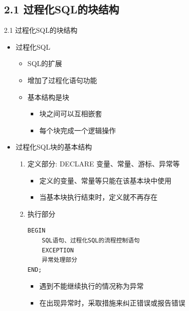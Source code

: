 \subsection{2.1 过程化SQL的块结构}
\begin{frame}{2.1 过程化SQL的块结构}
    \begin{itemize}
        \item 过程化SQL 
        \begin{itemize} 
            \item SQL的扩展
            \item 增加了过程化语句功能
            \item 基本结构是块
            \begin{itemize} 
                \item 块之间可以互相嵌套
                \item 每个块完成一个逻辑操作
            \end{itemize}
        \end{itemize}
        \item 过程化SQL块的基本结构
        \begin{enumerate}
            \item 定义部分: DECLARE 变量、常量、游标、异常等   
            \begin{itemize}
                \item 定义的变量、常量等只能在该基本块中使用
                \item 当基本块执行结束时，定义就不再存在
            \end{itemize}
            \item 执行部分
\begin{block}{}
\begin{lstlisting}
BEGIN
    SQL语句、过程化SQL的流程控制语句
    EXCEPTION
    异常处理部分
END;
\end{lstlisting}
\end{block} 
\begin{itemize}
    \item 遇到不能继续执行的情况称为异常
    \item 在出现异常时，采取措施来纠正错误或报告错误
\end{itemize}
        \end{enumerate}
    \end{itemize}
\end{frame}

